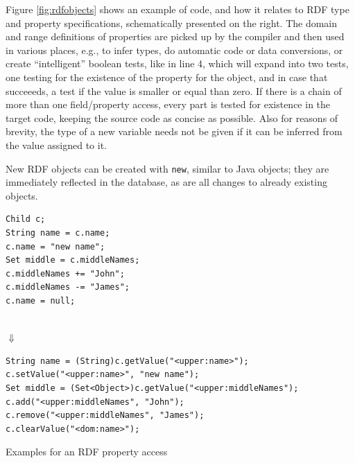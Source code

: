 Figure \ref{fig:rdfobjects} shows an example of \vonda code, and how it relates
to RDF type and property specifications, schematically presented on the right.  The
domain and range definitions of properties are picked up by the compiler and then
used in various places, e.g., to infer types, do automatic code or data
conversions, or create ``intelligent'' boolean tests, like in line 4, which
will expand into two tests, one testing for the existence of the property for
the object, and in case that succeeeds, a test if the value is smaller or equal than
zero. If there is a chain of more than one field/property access, every part is
tested for existence in the target code, keeping the source code as concise as
possible. Also for reasons of brevity, the type of a new variable needs not be
given if it can be inferred from the value assigned to it.

New RDF objects can be created with \texttt{new}, similar to Java objects; they
are immediately reflected in the database, as are all changes to already
existing objects.


\begin{table}[htbp]
  \centering
\begin{minipage}[t]{0.355\textwidth}
\begin{lstlisting}
Child c;
String name = c.name;
c.name = "new name";
Set middle = c.middleNames;
c.middleNames += "John";
c.middleNames -= "James";
c.name = null;
\end{lstlisting}
\end{minipage}\\{\Large$\Downarrow$}\\
\begin{minipage}[t]{0.8\textwidth}
\begin{lstlisting}
String name = (String)c.getValue("<upper:name>");
c.setValue("<upper:name>", "new name");
Set middle = (Set<Object>)c.getValue("<upper:middleNames");
c.add("<upper:middleNames", "John");
c.remove("<upper:middleNames", "James");
c.clearValue("<dom:name>");
\end{lstlisting}
\end{minipage}
  \caption{Examples for an RDF property access}
  \label{tab:property-access}
\end{table}

